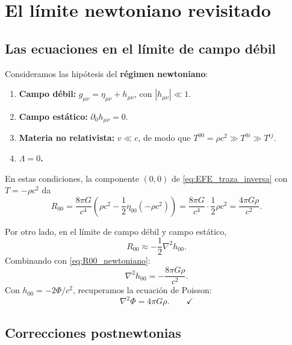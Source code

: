 \section{El límite newtoniano revisitado}
\label{sec:limite_newtoniano_EFE}

\subsection{Las ecuaciones en el límite de campo débil}

Consideramos las hipótesis del \textbf{régimen newtoniano}:
\begin{enumerate}[leftmargin=2em]
  \item \textbf{Campo débil:} $g_{\mu\nu} = \eta_{\mu\nu} + h_{\mu\nu}$, con $|h_{\mu\nu}| \ll 1$.
  \item \textbf{Campo estático:} $\partial_0 h_{\mu\nu} = 0$.
  \item \textbf{Materia no relativista:} $v \ll c$, de modo que $T^{00} = \rho c^2 \gg T^{0i} \gg T^{ij}$.
  \item \textbf{$\Lambda = 0$.}
\end{enumerate}

En estas condiciones, la componente $(0,0)$ de \eqref{eq:EFE_traza_inversa} con $T = -\rho c^2$ da
\begin{equation}
  R_{00} = \frac{8\pi G}{c^4}\left(\rho c^2 - \frac{1}{2}\eta_{00}(-\rho c^2)\right)
  = \frac{8\pi G}{c^4}\cdot\frac{1}{2}\rho c^2 = \frac{4\pi G\rho}{c^2}.
  \label{eq:R00_newtoniano}
\end{equation}

Por otro lado, en el límite de campo débil y campo estático,
\begin{equation}
  R_{00} \approx -\frac{1}{2}\nabla^2 h_{00}.
\end{equation}
Combinando con \eqref{eq:R00_newtoniano}:
\begin{equation}
  \nabla^2 h_{00} = -\frac{8\pi G\rho}{c^2}.
\end{equation}
Con $h_{00} = -2\Phi/c^2$, recuperamos la ecuación de Poisson:
\begin{equation}
  \nabla^2\Phi = 4\pi G\rho. \qquad\checkmark
\end{equation}

\subsection{Correcciones postnewtonias}


